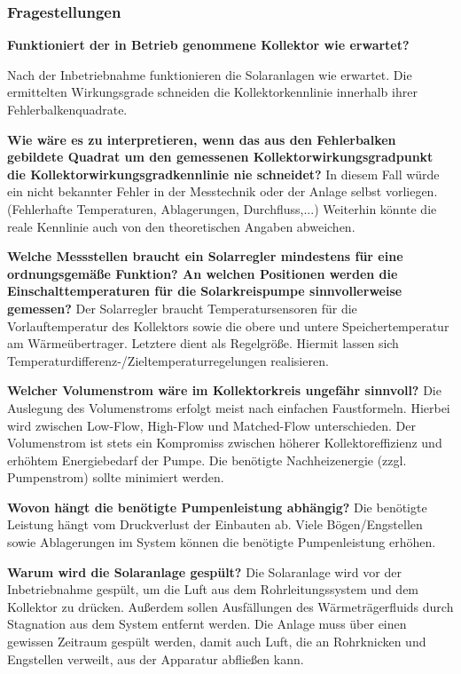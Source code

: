 \subsubsection{Fragestellungen}

\textbf{Funktioniert der in Betrieb genommene Kollektor wie erwartet?}

Nach der Inbetriebnahme funktionieren die Solaranlagen wie erwartet. Die ermittelten Wirkungsgrade schneiden die Kollektorkennlinie innerhalb ihrer Fehlerbalkenquadrate.

\textbf{Wie wäre es zu interpretieren, wenn das aus den Fehlerbalken gebildete Quadrat um den gemessenen Kollektorwirkungsgradpunkt die Kollektorwirkungsgradkennlinie nie schneidet?}
In diesem Fall würde ein nicht bekannter Fehler in der Messtechnik oder der Anlage selbst vorliegen. (Fehlerhafte Temperaturen, Ablagerungen, Durchfluss,...) Weiterhin könnte die reale Kennlinie auch von den theoretischen Angaben abweichen. 

\textbf{Welche Messstellen braucht ein Solarregler mindestens für eine ordnungsgemäße
	Funktion? An welchen Positionen werden die Einschalttemperaturen für die Solarkreispumpe
	sinnvollerweise gemessen?}
Der Solarregler braucht Temperatursensoren für die Vorlauftemperatur des Kollektors sowie die obere und untere Speichertemperatur am Wärmeübertrager. Letztere dient als Regelgröße. Hiermit lassen sich Temperaturdifferenz-/Zieltemperaturregelungen realisieren. 

\textbf{Welcher Volumenstrom wäre im Kollektorkreis ungefähr sinnvoll?}
Die Auslegung des Volumenstroms erfolgt meist nach einfachen Faustformeln. Hierbei wird zwischen Low-Flow, High-Flow und Matched-Flow unterschieden. Der Volumenstrom ist stets ein Kompromiss zwischen höherer Kollektoreffizienz  und erhöhtem Energiebedarf der Pumpe. Die benötigte Nachheizenergie (zzgl. Pumpenstrom) sollte minimiert werden.

\textbf{Wovon hängt die benötigte Pumpenleistung abhängig?}
Die benötigte Leistung hängt vom Druckverlust der Einbauten ab. Viele Bögen/Engstellen sowie Ablagerungen im System können die benötigte Pumpenleistung erhöhen.

\textbf{Warum wird die Solaranlage gespült?}
Die Solaranlage wird vor der Inbetriebnahme gespült, um die Luft aus dem Rohrleitungssystem und dem Kollektor zu drücken. Außerdem sollen Ausfällungen des Wärmeträgerfluids durch Stagnation aus dem System entfernt werden. Die Anlage muss über einen gewissen Zeitraum gespült werden, damit auch Luft, die an Rohrknicken und Engstellen verweilt, aus der Apparatur abfließen kann. 

